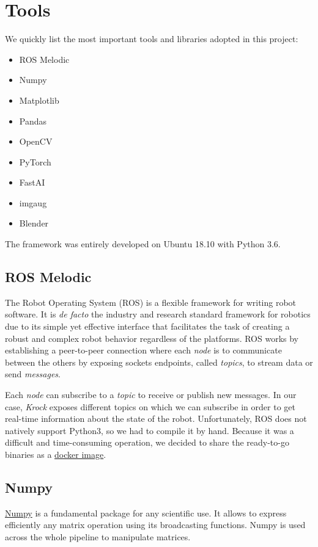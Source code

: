 \documentclass[../document.tex]{subfiles}
\begin{document}
\section{Tools}
We quickly list the most important tools and libraries adopted in this project:
\begin{itemize}
    \item ROS Melodic
    \item Numpy
    \item Matplotlib
    \item Pandas
    \item OpenCV
    \item PyTorch
    \item FastAI
    \item imgaug
    \item Blender
\end{itemize}
The framework was entirely developed on Ubuntu 18.10 with Python 3.6.

\subsection{ROS Melodic}
The Robot Operating System (ROS) \cite{ROS} is a flexible framework for writing robot software. It is \emph{de facto} the industry and research standard framework for robotics due to its simple yet effective interface that facilitates the task of creating a robust and complex robot behavior regardless of the platforms. ROS works by establishing a peer-to-peer connection where each \emph{node} is to communicate between the others by exposing sockets endpoints, called \emph{topics}, to stream data or send \emph{messages}. 

Each \emph{node} can subscribe to a \emph{topic} to receive or publish new messages. In our case, \emph{Krock} exposes different topics on which we can subscribe in order to get real-time information about the state of the robot.
Unfortunately, ROS does not natively support Python3, so we had to compile it by hand. Because it was a difficult and time-consuming operation, we decided to share the ready-to-go binaries as a \href{https://hub.docker.com/r/zuppif/ros-melodic-python3/}{docker image}. 


\subsection{Numpy}
\href{https://www.numpy.org/}{Numpy} is a fundamental package for any scientific use. It allows to express efficiently any matrix operation using its broadcasting functions. Numpy is used across the whole pipeline to manipulate matrices.
\end{document}
